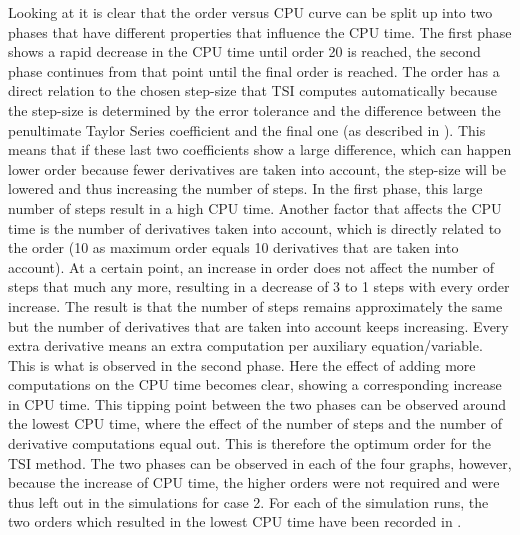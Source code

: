 Looking at  it is clear that the order versus CPU curve can be split up into two phases that have different properties that influence the CPU time. The first phase shows a rapid decrease in the CPU time until order 20 is reached, the second phase continues from that point until the final order is reached. The order has a direct relation to the chosen step-size that \ac{TSI} computes automatically because the step-size is determined by the error tolerance and the difference between the penultimate Taylor Series coefficient and the final one (as described in ). This means that if these last two coefficients show a large difference, which can happen lower order because fewer derivatives are taken into account, the step-size will be lowered and thus increasing the number of steps. In the first phase, this large number of steps result in a high CPU time. Another factor that affects the CPU time is the number of derivatives taken into account, which is directly related to the order (10 as maximum order equals 10 derivatives that are taken into account). At a certain point, an increase in order does not affect the number of steps that much any more, resulting in a decrease of 3 to 1 steps with every order increase. The result is that the number of steps remains approximately the same but the number of derivatives that are taken into account keeps increasing. Every extra derivative means an extra computation per auxiliary equation/variable. This is what is observed in the second phase. Here the effect of adding more computations on the CPU time becomes clear, showing a corresponding increase in CPU time. This tipping point between the two phases can be observed around the lowest CPU time, where the effect of the number of steps and the number of derivative computations equal out. This is therefore the optimum order for the \ac{TSI} method. The two phases can be observed in each of the four graphs, however, because the increase of CPU time, the higher orders were not required and were thus left out in the simulations for case 2. For each of the simulation runs, the two orders which resulted in the lowest CPU time have been recorded in . 

